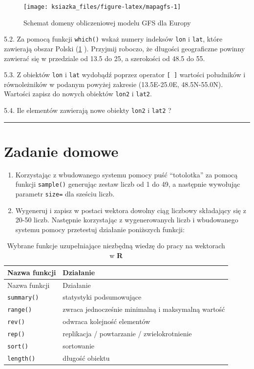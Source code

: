 \documentclass[]{book}
\providecommand{\tightlist}{%
  \setlength{\itemsep}{0pt}\setlength{\parskip}{0pt}}
\theoremstyle{definition}
\theoremstyle{definition}
\theoremstyle{definition}
\theoremstyle{remark}
\begin{document}
\begin{figure}

{\centering \texttt{[image: ksiazka\_files/figure-latex/mapagfs-1]} 

}

\caption{Schemat domeny obliczeniowej modelu GFS dla Europy}\label{fig:mapagfs}
\end{figure}

5.2. Za pomocą funkcji \texttt{which()} wskaż numery indeksów
\texttt{lon} i \texttt{lat}, które zawierają obszar Polski
(\ref{fig:mapagfs} ). Przyjmij roboczo, że długości geograficzne powinny
zawierać się w przedziale od 13.5 do 25, a szerokości od 48.5 do 55.

5.3. Z obiektów \texttt{lon} i \texttt{lat} wydobądź poprzez operator
\texttt{{[}\ {]}} wartości południków i równoleżników w podanym powyżej
zakresie (13.5E-25.0E, 48.5N-55.0N). Wartości zapisz do nowych obiektów
\texttt{lon2} i \texttt{lat2}.

5.4. Ile elementów zawierają nowe obiekty \texttt{lon2} i \texttt{lat2}
?

\begin{center}\rule{0.5\linewidth}{\linethickness}\end{center}

\section*{Zadanie domowe}\label{zadanie-domowe}

\begin{enumerate}
\def\labelenumi{\arabic{enumi}.}
\tightlist
\item
  Korzystając z wbudowanego systemu pomocy puść ``totolotka'' za pomocą
  funkcji \texttt{sample()} generując zestaw liczb od 1 do 49, a
  następnie wywołując parametr \texttt{size=} dla sześciu liczb.
\item
  Wygeneruj i zapisz w postaci wektora dowolny ciąg liczbowy składający
  się z 20-50 liczb. Następnie korzystając z wygenerowanych liczb i
  wbudowanego systemu pomocy przetestuj działanie poniższych funkcji:
\end{enumerate}

\begin{longtable}[]{@{}ll@{}}
\caption{Wybrane funkcje uzupełniające niezbędną wiedzę do pracy na
wektorach w \textbf{R}}\tabularnewline
\toprule
Nazwa funkcji & Działanie\tabularnewline
\midrule
\endfirsthead
\toprule
Nazwa funkcji & Działanie\tabularnewline
\midrule
\endhead
\texttt{summary()} & statystyki podsumowujące\tabularnewline
\texttt{range()} & zwraca jednocześnie minimalną i maksymalną
wartość\tabularnewline
\texttt{rev()} & odwraca kolejność elementów\tabularnewline
\texttt{rep()} & replikacja / powtarzanie /
zwielokrotnienie\tabularnewline
\texttt{sort()} & sortowanie\tabularnewline
\texttt{length()} & długość obiektu\tabularnewline
\bottomrule
\end{longtable}
\end{document}
